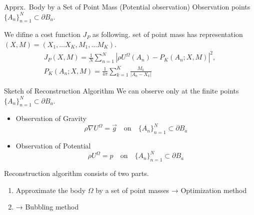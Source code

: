 \documentclass[dvipdfmx]{beamer}
\theoremstyle{remark}
\begin{document}
\begin{frame}{Apprx.~Body by a Set of Point Mass (Potential observation)}
  Observation points $\{A_n\}_{n=1}^N\subset \partial B_a$.
  \begin{figure}
    \centering
  \end{figure}

  We difine a cost function $J_P$ as following.
  set of point mass has representation $(X,M)=(X_1,\dots X_K, M_1,\dots M_K)$.
  \begin{gather*}
    J_P(X, M) = \frac{1}{N}\sum_{n=1}^N\left|\rho U^{\Omega}(A_n) - P_K(A_n;X,M)\right|^2, \\
    P_K(A_n;X,M) = \frac{1}{4\pi}\sum_{k=1}^K \frac{M_k}{|A_n-X_k|}
  \end{gather*}
\end{frame}

\begin{frame}{Sketch of Reconstruction Algorithm}
  We can observe only at the finite points $\{A_n\}_{n=1}^N\subset\partial B_a$.
  \begin{itemize}
    \item Observation of Gravity
    \[
      \rho\nabla U^{\Omega} = \overrightarrow{g} \quad \mathrm{on} \quad \{A_n\}_{n=1}^N\subset \partial B_a
    \]
  
    \item Observation of Potential
    \[
      \rho U^{\Omega} = p \quad \mathrm{on} \quad \{A_n\}_{n=1}^N\subset \partial B_a
    \]
  \end{itemize}

  Reconstruction algorithm consists of two parts.
  \begin{enumerate}
    \item Approximate the body $\Omega$ by a set of point masses → Optimization method
    \item {} → Bubbling method
  \end{enumerate}
  \ 
\end{frame}
\end{document}
